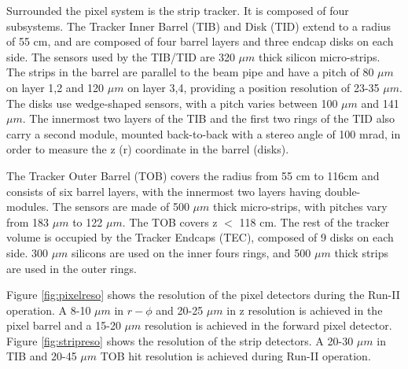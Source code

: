 \documentclass[thesis.tex]{subfiles}
\begin{document}
Surrounded the pixel system is the strip tracker. 
It is composed of four subsystems. 
The Tracker Inner Barrel (TIB) and Disk (TID) extend to a radius of 55 cm, and are composed of four barrel layers and three endcap disks on each side. 
The sensors used by the TIB/TID are 320 $\mu m$ thick silicon micro-strips. 
The strips in the barrel are parallel to the beam pipe and have a pitch of 80 $\mu m$ on layer 1,2 and 120 $\mu m$ on layer 3,4, providing a position resolution of 23-35 $\mu m$. 
The disks use wedge-shaped sensors, with a pitch varies between 100 $\mu m$ and 141 $\mu m$. 
The innermost two layers of the TIB and the first two rings of the TID also carry a second module, mounted back-to-back with a stereo angle of 100 mrad, in order to measure the z (r) coordinate in the barrel (disks). 

The Tracker Outer Barrel (TOB) covers the radius from 55 cm to 116cm and consists of six barrel layers, with the innermost two layers having double-modules. 
The sensors are made of 500 $\mu m$ thick micro-strips, with pitches vary from 183 $\mu m$ to 122 $\mu m$. 
The TOB covers z $<$ 118 cm. The rest of the tracker volume is occupied by the Tracker Endcaps (TEC), composed of 9 disks on each side. 
300 $\mu m$ silicons are used on the inner fours rings, and 500 $\mu m$ thick strips are used in the outer rings. 


Figure \ref{fig:pixelreso} shows the resolution of the pixel detectors during the Run-II operation.
A 8-10 $\mu m$ in $r-\phi$ and 20-25 $\mu m$ in z resolution is achieved in the pixel barrel and a 15-20 $\mu m$ resolution is achieved in the forward pixel detector.
Figure \ref{fig:stripreso} shows the resolution of the strip detectors. A 20-30 $\mu m$ in TIB and 20-45  $\mu m$ TOB hit resolution is achieved during Run-II operation.
\end{document}
